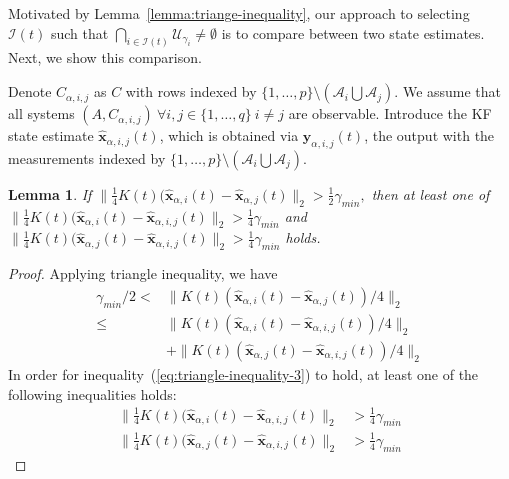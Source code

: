 \documentclass[journal]{IEEEtran}
\newtheorem{Lemma}{Lemma}
\begin{document}
Motivated by Lemma~\ref{lemma:triange-inequality}, our approach to selecting $\mathcal{I}(t)$ such that $\bigcap_{i \in {\mathcal{I}}(t)} \mathcal{U}_{\gamma_i} \neq \emptyset$ is to compare between two state estimates. Next, we show this comparison.

Denote $C_{\alpha, i, j}$ as $C$ with rows indexed by $\{1,\ldots,p\} \setminus (\mathcal{A}_{i} \bigcup \mathcal{A}_{j})$. We assume that all systems $(A, C_{\alpha, i, j}) \ \forall i,j \in \{1,\ldots,q\} \ i \neq j$ are observable. Introduce the KF state estimate $\hat{\mathbf{x}}_{\alpha,i,j}(t)$, which is obtained via $\mathbf{y}_{\alpha,i,j}(t)$, the output with the measurements indexed by $\{1,\ldots,p\} \setminus (\mathcal{A}_i \bigcup \mathcal{A}_j)$. 

\begin{Lemma}
\label{lemma:triange-inequality2}
If $\|\frac{1}{4}K(t)(\mathbf{\hat{x}}_{\alpha,i}(t) - \mathbf{\hat{x}}_{\alpha,j}(t)\|_2 > \frac{1}{2}\gamma_{min},$ then at least one of $\|\frac{1}{4}K(t)(\mathbf{\hat{x}}_{\alpha,i}(t) - \mathbf{\hat{x}}_{\alpha,i,j}(t)\|_2 > \frac{1}{4}\gamma_{min}$ and $\|\frac{1}{4}K(t)(\mathbf{\hat{x}}_{\alpha,j}(t) - \mathbf{\hat{x}}_{\alpha,i,j}(t)\|_2 > \frac{1}{4}\gamma_{min}$ holds.
\end{Lemma}

\begin{proof}
Applying triangle inequality, we have
    \begin{align}
        \gamma_{min}/2 < &\|K(t)(\mathbf{\hat{x}}_{\alpha,i}(t) - \mathbf{\hat{x}}_{\alpha,j}(t))/4\|_2 \nonumber \\
        \leq &\|K(t)(\mathbf{\hat{x}}_{\alpha,i}(t) - \mathbf{\hat{x}}_{\alpha,i,j}(t))/4\|_2\nonumber \\
        &+ \|K(t)(\mathbf{\hat{x}}_{\alpha,j}(t) - \mathbf{\hat{x}}_{\alpha,i,j}(t))/4\|_2 
         \label{eq:triangle-inequality-3}
    \end{align}
In order for inequality~(\ref{eq:triangle-inequality-3}) to hold, at least one of the following inequalities holds:
\begin{align}
    \|\frac{1}{4}K(t)(\mathbf{\hat{x}}_{\alpha,i}(t) - \mathbf{\hat{x}}_{\alpha,i,j}(t)\|_2 &> \frac{1}{4}\gamma_{min} \label{eq:metric1}\\
    \|\frac{1}{4}K(t)(\mathbf{\hat{x}}_{\alpha,j}(t) - \mathbf{\hat{x}}_{\alpha,i,j}(t)\|_2 &> \frac{1}{4}\gamma_{min}
    \label{eq:metric2}
\end{align}
\end{proof}
\end{document}
